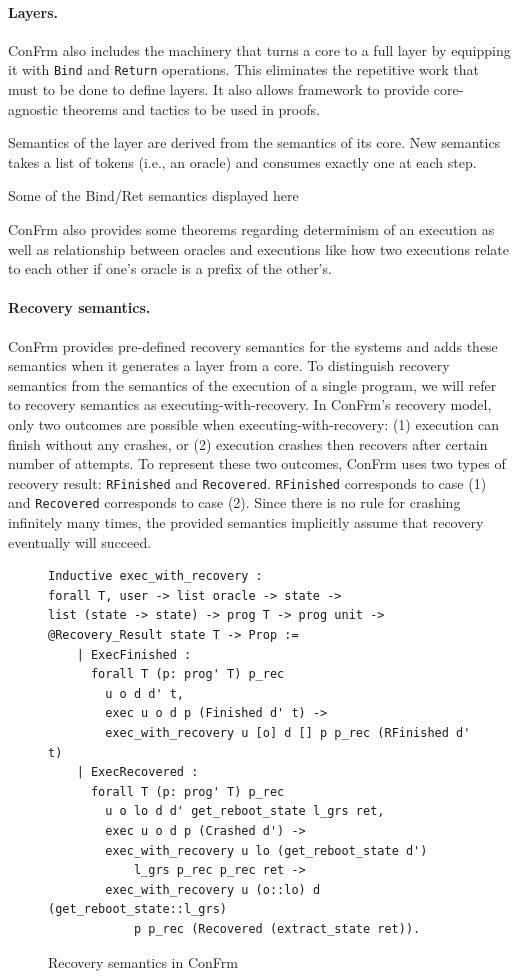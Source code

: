 \paragraph{Layers.}
ConFrm also includes the machinery that turns a core to a full layer by equipping it with \texttt{Bind} and \texttt{Return} operations. This eliminates the repetitive work that must to be done to define layers. It also allows framework to provide core-agnostic theorems and tactics to be used in proofs.

Semantics of the layer are derived from the semantics of its core. New  semantics takes a list of tokens (i.e., an oracle) and consumes exactly one at each step. 

{\color{red} Some of the Bind/Ret semantics displayed here}

ConFrm also provides some theorems regarding determinism of an execution as well as relationship between oracles and executions like how two executions relate to each other if one's oracle is a prefix of the other's.

\paragraph{Recovery semantics.}
ConFrm provides pre-defined recovery semantics for the systems and adds these semantics when it generates a layer from a core. To distinguish recovery semantics from the semantics of the execution of a single program, we will refer to recovery semantics as executing-with-recovery. In ConFrm's recovery model, only two outcomes are possible when executing-with-recovery: (1) execution can finish without any crashes, or (2) execution crashes then recovers after certain number of attempts. To represent these two outcomes, ConFrm uses two types of recovery result: \texttt{RFinished} and \texttt{Recovered}. \texttt{RFinished} corresponds to case (1) and \texttt{Recovered} corresponds to case (2). Since there is no rule for crashing infinitely many times, the provided semantics implicitly assume that recovery eventually will succeed. 

\begin{figure}[H]
    \centering
    \begin{verbatim}
Inductive exec_with_recovery :
forall T, user -> list oracle -> state -> 
list (state -> state) -> prog T -> prog unit -> 
@Recovery_Result state T -> Prop :=
    | ExecFinished :
      forall T (p: prog' T) p_rec
        u o d d' t,
        exec u o d p (Finished d' t) ->
        exec_with_recovery u [o] d [] p p_rec (RFinished d' t)
    | ExecRecovered :
      forall T (p: prog' T) p_rec
        u o lo d d' get_reboot_state l_grs ret,
        exec u o d p (Crashed d') ->
        exec_with_recovery u lo (get_reboot_state d') 
            l_grs p_rec p_rec ret ->
        exec_with_recovery u (o::lo) d (get_reboot_state::l_grs) 
            p p_rec (Recovered (extract_state ret)).
    \end{verbatim}
    \caption{Recovery semantics in ConFrm}
    \label{fig:Recovery_Semantics}
\end{figure}

